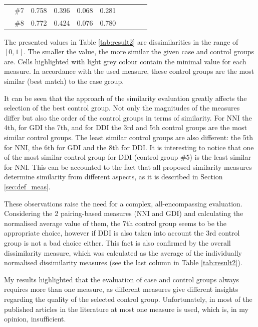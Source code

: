 \begin{table}[h]
\begin{tabular}{cc|cccccccc}
				                                         & \#7 & 0.758                                 & \leavevmode\cellcolor{lightgray}0.396 & 0.068                                 & \leavevmode\cellcolor{gray}0.281 \\
				                                         & \#8 & 0.772                                 & 0.424                                 & 0.076                                 & 0.780                            \\ \bottomrule
			\end{tabular}
			\egroup
		\end{table}
										
		The presented values in Table \ref{tab:result2} are dissimilarities in the range of $[0,1]$. The smaller the value, the more similar the given case and control groups are. Cells highlighted with light grey colour contain the minimal value for each measure. In accordance with the used measure, these control groups are the most similar (best match) to the case group.
						  
		It can be seen that the approach of the similarity evaluation greatly affects the selection of the best control group. Not only the magnitudes of the measures differ but also the order of the control groups in terms of similarity. For NNI the 4th, for GDI the 7th, and for DDI the 3rd and 5th control groups are the most similar control groups. The least similar control groups are also different: the 5th for NNI, the 6th for GDI and the 8th for DDI. It is interesting to notice that one of the most similar control group for DDI (control group \#5) is the least similar for NNI. This can be accounted to the fact that all proposed similarity measures determine similarity from different aspects, as it is described in Section \ref{sec:def_meas}.
										
		These observations raise the need for a complex, all-encompassing evaluation. Considering the 2 pairing-based measures (NNI and GDI) and calculating the normalised average value of them, the 7th control group seems to be the appropriate choice, however if DDI is also taken into account the 3rd control group is not a bad choice either. This fact is also confirmed by the overall dissimilarity measure, which was calculated as the average of the individually normalised dissimilarity measures (see the last column in Table \ref{tab:result2}).
		
		My results highlighted that the evaluation of case and control groups always requires more than one measure, as different measures give different insights regarding the quality of the selected control group. Unfortunately, in most of the published articles in the literature at most one measure is used, which is, in my opinion, insufficient.
										
